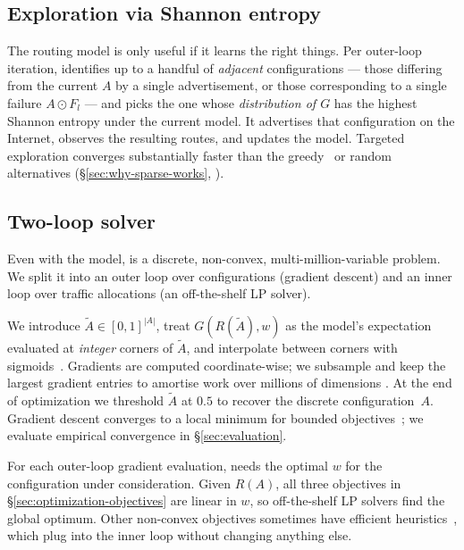 \documentclass[acmsmall,anonymous,review,nonacm,10pt]{acmart}
\begin{document}
\subsection{Exploration via Shannon entropy}
\label{sec:optimization-exploration}

The routing model is only useful if it learns the right things.
Per outer-loop iteration, \sparse identifies up to a handful of
\emph{adjacent} configurations --- those differing from the
current $A$ by a single advertisement, or those corresponding to a
single failure $A \odot F_l$ --- and picks the one whose
\emph{distribution of $G$} has the highest Shannon entropy under
the current model.  It advertises that configuration on the
Internet, observes the resulting routes, and updates the model.
Targeted exploration converges substantially faster than the
greedy~\cite{painter} or random~\cite{anyopt} alternatives
(\S\ref{sec:why-sparse-works}, ).

\subsection{Two-loop solver}
\label{sec:optimization-solver}

Even with the model,  is a discrete,
non-convex, multi-million-variable problem.  We split it into an
outer loop over configurations (gradient descent) and an inner
loop over traffic allocations (an off-the-shelf LP solver).

We introduce $\tilde A \in [0,1]^{|A|}$, treat
$G(R(\tilde A), w)$ as the model's expectation evaluated at
\emph{integer} corners of $\tilde A$, and interpolate between
corners with sigmoids~\cite{langer2021approximating}.  Gradients
are computed coordinate-wise; we subsample and keep the largest
gradient entries to amortise work over millions of dimensions
\cite{shechtman2014gespar}.  At the end of optimization we
threshold $\tilde A$ at $0.5$ to recover the discrete configuration~$A$.
Gradient descent converges to a local minimum for bounded
objectives~\cite{li2024convex}; we evaluate empirical convergence
in \S\ref{sec:evaluation}.

  For each outer-loop
gradient evaluation, \sparse needs the optimal $w$ for the
configuration under consideration.  Given $R(A)$, all three
objectives in \S\ref{sec:optimization-objectives} are linear in
$w$, so off-the-shelf LP solvers find the global optimum.  Other
non-convex objectives sometimes have efficient
heuristics~\cite{cascara}, which plug into the inner loop without
changing anything else.
\end{document}
